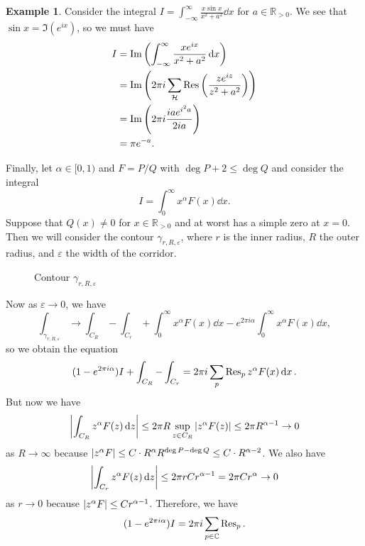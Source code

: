 \documentclass[leqno, openany]{memoir}
\theoremstyle{definition}
\newtheorem{exm}[thm]{Example}
\theoremstyle{remark}
\theoremstyle{plain}
\theoremstyle{definition}
\theoremstyle{remark}
\newcommand{\R}{\mathbb{R}}
\newcommand{\C}{\mathbb{C}}
\newcommand{\ep}{\varepsilon}
\newcommand{\mc}[1]{\mathcal{#1}}
\begin{document}
\begin{exm} Consider the integral $I = \int_{- \infty}^{\infty} \frac{x \sin
    x}{x^2 + a^2} \dd{x}$ for $a \in \R_{>0}$. We see that $\sin x =
    \Im(e^{ix})$, so we must have \begin{align*} I &=
        \Im\qty(\int_{-\infty}^{\infty} \frac{xe^{ix}}{x^2+a^2} \dd{x}) \\ &=
    \Im \qty(2 \pi i \sum_{\mc{H}} \Res \qty(\frac{ze^{iz}}{z^2 + a^2})) \\ &=
\Im\qty(2 \pi i \frac{ia e^{i^2a}}{2ia}) \\ &= \pi e^{-a}.  \end{align*}
    \end{exm}

Finally, let $\alpha \in [0,1)$ and $F = P/Q$ with $\deg P + 2 \leq \deg Q$ and
consider the integral \[ I = \int_0^{\infty} x^{\alpha} F(x) \dd{x}. \] Suppose
that $Q(x) \neq 0$ for $x \in \R_{>0}$ and at worst has a simple zero at $x =
0$. Then we will consider the contour $\gamma_{r,R, \ep}$, where $r$ is the
inner radius, $R$ the outer radius, and $\ep$ the width of the corridor.
\begin{figure}[H] \begin{center} 
\end{center} \caption{Contour $\gamma_{r,R,\ep}$}%
\end{figure}
Now as $\ep \to 0$, we have \[ \int_{\gamma_{r,R,\ep}} \to \int_{C_R} -
\int_{C_r} + \int_{0}^{\infty} x^{\alpha} F(x) \dd{x} - e^{2 \pi i \alpha}
\int_0^{\infty} x^{\alpha} F(x) \dd{x}, \] so we obtain the equation \[ (1 -
e^{2 \pi i \alpha})I + \int_{C_R} - \int_{C_r} = 2 \pi i \sum_p \Res_p
z^{\alpha} F(x) \dd{x}. \] But now we have \[ \abs{\int_{C_R} z^{\alpha} F(z)
\dd{z}} \leq 2 \pi R \sup_{z \in C_R} \abs{z^{\alpha} F(z)} \leq 2 \pi
R^{\alpha - 1} \to 0 \] as $R \to \infty$ because $\abs{z^{\alpha} F} \leq C
\cdot R^{\alpha} R^{\deg P - \deg Q} \leq C \cdot R^{\alpha - 2}$. We also have
\[ \abs{\int_{C_r} z^{\alpha} F(z) \dd{z}} \leq 2 \pi r C r^{\alpha - 1} = 2
\pi C r^{\alpha} \to 0 \] as $r \to 0$ because $\abs{z^{\alpha}F} \leq C
r^{\alpha - 1}$. Therefore, we have \[ (1 - e^{2 \pi i \alpha}) I = 2 \pi i
\sum_{p \in \C} \Res_p. \]
\end{document}
